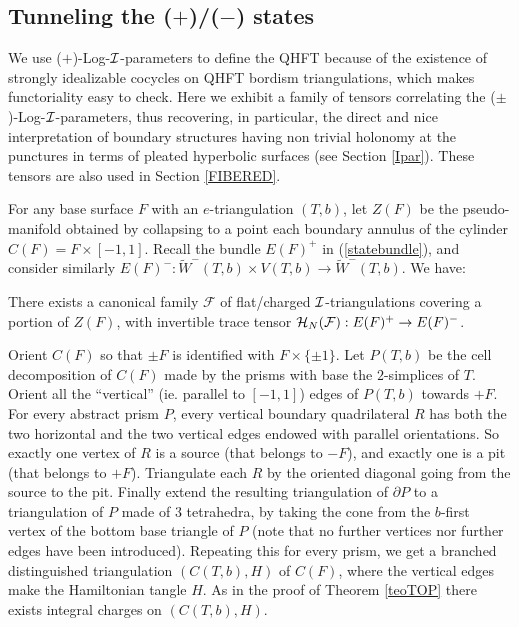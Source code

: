 \subsection{Tunneling the ($+$)/($-$) states}\label{+-versus} We use
($+$)-Log-${\mathcal I}$-parameters to define the QHFT because of the existence
of strongly idealizable cocycles on QHFT bordism triangulations, which
makes functoriality easy to check. Here we exhibit a family of tensors
correlating the ($\pm$)-Log-${\mathcal I}$-parameters, thus recovering, in
particular, the direct and nice interpretation of boundary structures
having non trivial holonomy at the punctures in terms of pleated
hyperbolic surfaces (see Section \ref{Ipar}). These tensors are also
used in Section \ref{FIBERED}.
\smallskip

For any base surface $F$ with an $e$-triangulation $(T,b)$, let $Z(F)$
be the pseudo-manifold obtained by collapsing to a point each boundary
annulus of the cylinder $C(F)=F\times [-1,1]$.  Recall the bundle
$E(F)^{+}$ in (\ref{statebundle}), and consider similarly
$E(F)^{-}:\tilde{W}^-(T,b) \times V(T,b) \rightarrow
\tilde{W}^-(T,b)$. We have:
\begin{prop}\label{tunnel+-} There exists a canonical family $\mathcal{F}$
of flat/charged ${\mathcal I}$-triangulations covering a portion of $Z(F)$,
with invertible trace tensor ${\mathcal H}_N(\mathcal{F}): E(F)^{+}
\rightarrow E(F)^-$.
\end{prop}
 Orient $C(F)$ so that $\pm F$ is identified
with $F\times \{\pm 1\}$. Let $P(T,b)$ be the cell decomposition
of $C(F)$ made by the prisms with base the $2$-simplices of $T$.
Orient all the ``vertical'' (ie. parallel to $[-1,1]$) edges of
$P(T,b)$ towards $+F$. For every abstract prism $P$, every
vertical boundary quadrilateral $R$ has both the two horizontal
and the two vertical edges endowed with parallel orientations. So
exactly one vertex of $R$ is a source (that belongs to $-F$), and
exactly one is a pit (that belongs to $+F$). Triangulate each $R$
by the oriented diagonal going from the source to the pit. Finally
extend the resulting triangulation of $\partial P$ to a
triangulation of $P$ made of $3$ tetrahedra, by taking the cone
from the $b$-first vertex of the bottom base triangle of $P$ (note
that no further vertices nor further edges have been introduced).
Repeating this for every prism, we get a branched distinguished
triangulation $(C(T,b),H)$ of $C(F)$, where the vertical edges
make the Hamiltonian tangle $H$. As in the proof of Theorem
\ref{teoTOP} there exists integral charges on $(C(T,b),H)$.

